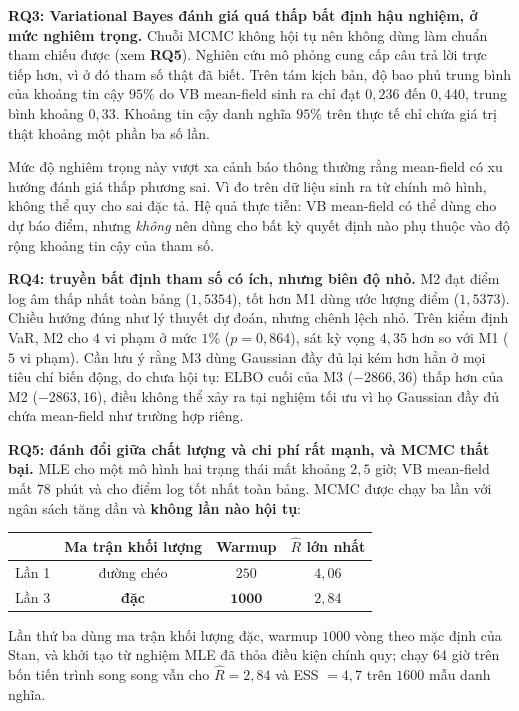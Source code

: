 \documentclass[12pt,a4paper]{article}
\numberwithin{equation}{section}
\newcommand{\RQ}[1]{\textbf{RQ#1}}
\begin{document}
\textbf{\RQ{3}: Variational Bayes đánh giá quá thấp bất định hậu nghiệm, ở mức nghiêm trọng.} Chuỗi MCMC không hội tụ nên không dùng làm chuẩn tham chiếu được (xem \RQ{5}). Nghiên cứu mô phỏng cung cấp câu trả lời trực tiếp hơn, vì ở đó tham số thật đã biết. Trên tám kịch bản, độ bao phủ trung bình của khoảng tin cậy $95\%$ do VB mean-field sinh ra chỉ đạt $0{,}236$ đến $0{,}440$, trung bình khoảng $0{,}33$. Khoảng tin cậy danh nghĩa $95\%$ trên thực tế chỉ chứa giá trị thật khoảng một phần ba số lần.

Mức độ nghiêm trọng này vượt xa cảnh báo thông thường rằng mean-field có xu hướng đánh giá thấp phương sai. Vì đo trên dữ liệu sinh ra từ chính mô hình, không thể quy cho sai đặc tả. Hệ quả thực tiễn: VB mean-field có thể dùng cho dự báo điểm, nhưng \emph{không} nên dùng cho bất kỳ quyết định nào phụ thuộc vào độ rộng khoảng tin cậy của tham số.

\textbf{\RQ{4}: truyền bất định tham số có ích, nhưng biên độ nhỏ.} M2 đạt điểm log âm thấp nhất toàn bảng ($1{,}5354$), tốt hơn M1 dùng ước lượng điểm ($1{,}5373$). Chiều hướng đúng như lý thuyết dự đoán, nhưng chênh lệch nhỏ. Trên kiểm định VaR, M2 cho $4$ vi phạm ở mức $1\%$ ($p=0{,}864$), sát kỳ vọng $4{,}35$ hơn so với M1 ($5$ vi phạm). Cần lưu ý rằng M3 dùng Gaussian đầy đủ lại kém hơn hẳn ở mọi tiêu chí biến động, do chưa hội tụ: ELBO cuối của M3 ($-2866{,}36$) thấp hơn của M2 ($-2863{,}16$), điều không thể xảy ra tại nghiệm tối ưu vì họ Gaussian đầy đủ chứa mean-field như trường hợp riêng.

\textbf{\RQ{5}: đánh đổi giữa chất lượng và chi phí rất mạnh, và MCMC thất bại.} MLE cho một mô hình hai trạng thái mất khoảng $2{,}5$ giờ; VB mean-field mất $78$ phút và cho điểm log tốt nhất toàn bảng. MCMC được chạy ba lần với ngân sách tăng dần và \textbf{không lần nào hội tụ}:

\begin{center}
\begin{tabular}{lccc}
\toprule
& Ma trận khối lượng & Warmup & $\widehat R$ lớn nhất \\
\midrule
Lần 1 & đường chéo & $250$ & $4{,}06$ \\
Lần 3 & \textbf{đặc} & $\mathbf{1000}$ & $2{,}84$ \\
\bottomrule
\end{tabular}
\end{center}

Lần thứ ba dùng ma trận khối lượng đặc, warmup $1000$ vòng theo mặc định của Stan, và khởi tạo từ nghiệm MLE đã thỏa điều kiện chính quy; chạy $64$ giờ trên bốn tiến trình song song vẫn cho $\widehat R = 2{,}84$ và ESS $=4{,}7$ trên $1600$ mẫu danh nghĩa.
\end{document}
